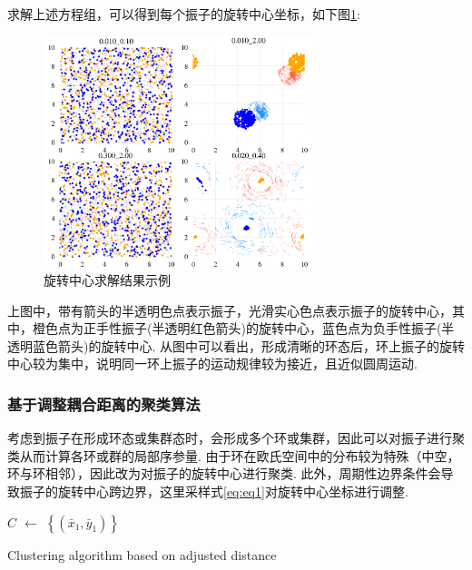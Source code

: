 \documentclass{article}
\begin{document}
求解上述方程组，可以得到每个振子的旋转中心坐标，如下图\ref{fig:fig232.2}:%

\begin{figure}[H]
	\centering
	\includegraphics[width=0.7\textwidth]{./figs/centorsBigGraph_sub.png}
	\vspace{-0.2cm}
	\caption{旋转中心求解结果示例}
	\label{fig:fig232.2}
\end{figure}

上图中，带有箭头的半透明色点表示振子，光滑实心色点表示振子的旋转中心，其中，橙色点为正手性振子(半透明红色箭头)的旋转中心，蓝色点为负手性振子(半透明蓝色箭头)的旋转中心. 从图中可以看出，形成清晰的环态后，环上振子的旋转中心较为集中，说明同一环上振子的运动规律较为接近，且近似圆周运动.



\subsubsection{基于调整耦合距离的聚类算法}\label{clustering}

考虑到振子在形成环态或集群态时，会形成多个环或集群，因此可以对振子进行聚类从而计算各环或群的局部序参量. 由于环在欧氏空间中的分布较为特殊（中空，环与环相邻），因此改为对振子的旋转中心进行聚类. 此外，周期性边界条件会导致振子的旋转中心跨边界，这里采样式\ref{eq:eq1}对旋转中心坐标进行调整.

\begin{algorithm}

	\BlankLine
	\emph{$C$ $\leftarrow$ $\left\{(\bar{x}_1, \bar{y}_1)\right\}$}\;
	\caption{Clustering algorithm based on adjusted distance}\label{algo_disjdecomp}
\end{algorithm}\DecMargin{1em}
\end{document}
